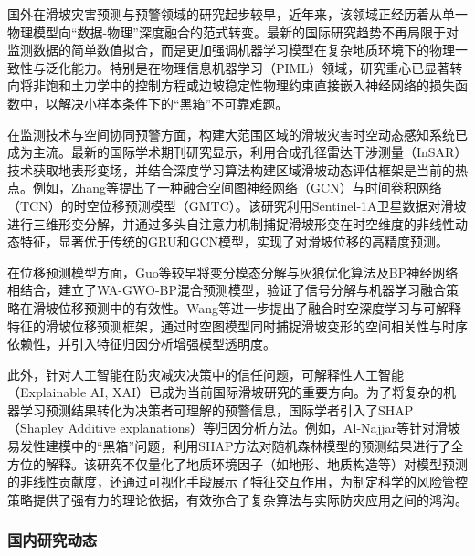 \documentclass[12pt,a4paper]{article}
\begin{document}
国外在滑坡灾害预测与预警领域的研究起步较早，近年来，该领域正经历着从单一物理模型向“数据-物理”深度融合的范式转变。最新的国际研究趋势不再局限于对监测数据的简单数值拟合，而是更加强调机器学习模型在复杂地质环境下的物理一致性与泛化能力。特别是在物理信息机器学习（PIML）领域，研究重心已显著转向将非饱和土力学中的控制方程或边坡稳定性物理约束直接嵌入神经网络的损失函数中，以解决小样本条件下的“黑箱”不可靠难题。

在监测技术与空间协同预警方面，构建大范围区域的滑坡灾害时空动态感知系统已成为主流。最新的国际学术期刊研究显示，利用合成孔径雷达干涉测量（InSAR）技术获取地表形变场，并结合深度学习算法构建区域滑坡动态评估框架是当前的热点。例如，Zhang等\cite{zhang2025spatiotemporal}提出了一种融合空间图神经网络（GCN）与时间卷积网络（TCN）的时空位移预测模型（GMTC）。该研究利用Sentinel-1A卫星数据对滑坡进行三维形变分解，并通过多头自注意力机制捕捉滑坡形变在时空维度的非线性动态特征，显著优于传统的GRU和GCN模型，实现了对滑坡位移的高精度预测。

在位移预测模型方面，Guo等\cite{guo2020landslide}较早将变分模态分解与灰狼优化算法及BP神经网络相结合，建立了WA-GWO-BP混合预测模型，验证了信号分解与机器学习融合策略在滑坡位移预测中的有效性。Wang等\cite{wang2025enhancing}进一步提出了融合时空深度学习与可解释特征的滑坡位移预测框架，通过时空图模型同时捕捉滑坡变形的空间相关性与时序依赖性，并引入特征归因分析增强模型透明度。

此外，针对人工智能在防灾减灾决策中的信任问题，可解释性人工智能（Explainable AI, XAI）已成为当前国际滑坡研究的重要方向。为了将复杂的机器学习预测结果转化为决策者可理解的预警信息，国际学者引入了SHAP（Shapley Additive explanations）等归因分析方法。例如，Al-Najjar等\cite{al2025shapley}针对滑坡易发性建模中的“黑箱”问题，利用SHAP方法对随机森林模型的预测结果进行了全方位的解释。该研究不仅量化了地质环境因子（如地形、地质构造等）对模型预测的非线性贡献度，还通过可视化手段展示了特征交互作用，为制定科学的风险管控策略提供了强有力的理论依据，有效弥合了复杂算法与实际防灾应用之间的鸿沟。

\subsubsection{国内研究动态}
\end{document}
